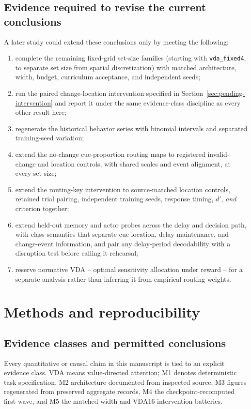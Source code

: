 \documentclass[11pt,a4paper]{article}
\newcommand{\env}[1]{\texttt{#1}}
\begin{document}
\subsection{Evidence required to revise the current conclusions}
A later study could extend these conclusions only by meeting the following:
\begin{enumerate}
\item complete the remaining fixed-grid set-size families (starting with \env{vda\_fixed4}, to separate set size from spatial discretization) with matched architecture, width, budget, curriculum acceptance, and independent seeds;
\item run the paired change-location intervention specified in Section~\ref{sec:pending-intervention} and report it under the same evidence-class discipline as every other result here;
\item regenerate the historical behavior series with binomial intervals and separated training-seed variation;
\item extend the no-change cue-proportion routing maps to registered invalid-change and location controls, with shared scales and event alignment, at every set size;
\item extend the routing-key intervention to source-matched location controls, retained trial pairing, independent training seeds, response timing, $d'$, \emph{and} criterion together;
\item extend held-out memory and actor probes across the delay and decision path, with class semantics that separate cue-location, delay-maintenance, and change-event information, and pair any delay-period decodability with a disruption test before calling it rehearsal;
\item reserve normative VDA -- optimal sensitivity allocation under reward -- for a separate analysis rather than inferring it from empirical routing weights.
\end{enumerate}

\section{Methods and reproducibility}\label{sec:methods}
\subsection{Evidence classes and permitted conclusions}\label{sec:evidence-classes}
Every quantitative or causal claim in this manuscript is tied to an explicit evidence class. VDA means value-directed attention; M1 denotes deterministic task specification, M2 architecture documented from inspected source, M3 figures regenerated from preserved aggregate records, M4 the checkpoint-recomputed first wave, and M5 the matched-width and VDA16 intervention batteries.
\end{document}
